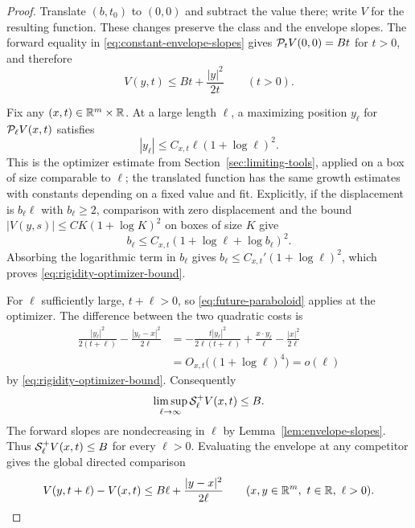 \begin{proof}
Translate $(b,t_0)$ to $(0,0)$ and subtract the value there; write $V$ for the resulting function. These changes preserve the class and the envelope slopes. The forward equality in \eqref{eq:constant-envelope-slopes} gives $\mathcal{P}_tV(0,0)=Bt$ for $t>0$, and therefore
\begin{equation}\label{eq:future-paraboloid}
  V(y,t)\le Bt+\frac{|y|^2}{2t}\qquad(t>0).
\end{equation}

Fix any $(x,t)\in\mathbb{R}^m\times\mathbb{R}$. At a large length $\ell$, a maximizing position $y_\ell$ for $\mathcal{P}_\ell V(x,t)$ satisfies
\begin{equation}\label{eq:rigidity-optimizer-bound}
  |y_\ell|\le C_{x,t}\ell(1+\log\ell)^2.
\end{equation}
This is the optimizer estimate from Section~\ref{sec:limiting-tools}, applied on a box of size comparable to $\ell$; the translated function has the same growth estimates with constants depending on a fixed value and fit. Explicitly, if the displacement is $b_\ell\ell$ with $b_\ell\ge2$, comparison with zero displacement and the bound $|V(y,s)|\le C K(1+\log K)^2$ on boxes of size $K$ give
\[
  b_\ell\le C_{x,t}(1+\log\ell+\log b_\ell)^2.
\]
Absorbing the logarithmic term in $b_\ell$ gives $b_\ell\le C_{x,t}'(1+\log\ell)^2$, which proves \eqref{eq:rigidity-optimizer-bound}.

For $\ell$ sufficiently large, $t+\ell>0$, so \eqref{eq:future-paraboloid} applies at the optimizer. The difference between the two quadratic costs is
\begin{align*}
  \frac{|y_\ell|^2}{2(t+\ell)}-\frac{|y_\ell-x|^2}{2\ell}
  &=-\frac{t|y_\ell|^2}{2\ell(t+\ell)}
       +\frac{x\cdot y_\ell}{\ell}-\frac{|x|^2}{2\ell}\\
  &=O_{x,t}\bigl((1+\log\ell)^4\bigr)=o(\ell)
\end{align*}
by \eqref{eq:rigidity-optimizer-bound}. Consequently
\[
  \limsup_{\ell\to\infty}\mathcal{S}_\ell^+V(x,t)\le B.
\]
The forward slopes are nondecreasing in $\ell$ by Lemma~\ref{lem:envelope-slopes}. Thus $\mathcal{S}_\ell^+V(x,t)\le B$ for every $\ell>0$. Evaluating the envelope at any competitor gives the global directed comparison
\begin{equation}\label{eq:directed-comparison}
  V(y,t+\ell)-V(x,t)\le B\ell+\frac{|y-x|^2}{2\ell}
       \qquad(x,y\in\mathbb{R}^m,\ t\in\mathbb{R},\ \ell>0).
\end{equation}


\end{proof}
